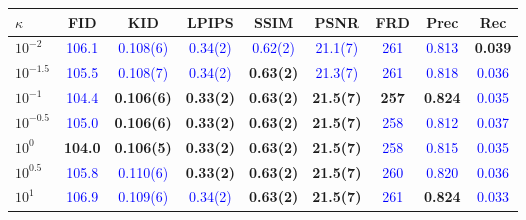 \documentclass[twoside,11pt]{article}
\begin{document}
\begin{table}[ht!]
\centering
\renewcommand{\arraystretch}{1.4}
\setlength{\tabcolsep}{6pt}
\small
\begin{tabular}{lcccccccc}
\toprule
\rowcolor{gray!20}
\textbf{$\kappa$} & \textbf{FID} & \textbf{KID} & \textbf{LPIPS} & \textbf{SSIM} & \textbf{PSNR} & \textbf{FRD} & \textbf{Prec} & \textbf{Rec} \\
\midrule
$10^{-2}$    & \textcolor{blue}{106.1} & \textcolor{blue}{0.108(6)} & \textcolor{blue}{0.34(2)} & \textcolor{blue}{0.62(2)} & \textcolor{blue}{21.1(7)} & \textcolor{blue}{261} & \textcolor{blue}{0.813} & \textbf{\textcolor{green!50!black}{0.039}} \\
$10^{-1.5}$  & \textcolor{blue}{105.5} & \textcolor{blue}{0.108(7)} & \textcolor{blue}{0.34(2)} & \textbf{\textcolor{green!50!black}{0.63(2)}} & \textcolor{blue}{21.3(7)} & \textcolor{blue}{261} & \textcolor{blue}{0.818} & \textcolor{blue}{0.036} \\
$10^{-1}$    & \textcolor{blue}{104.4} & \textbf{\textcolor{green!50!black}{0.106(6)}} & \textbf{\textcolor{green!50!black}{0.33(2)}} & \textbf{\textcolor{green!50!black}{0.63(2)}} & \textbf{\textcolor{green!50!black}{21.5(7)}} & \textbf{\textcolor{green!50!black}{257}} & \textbf{\textcolor{green!50!black}{0.824}} & \textcolor{blue}{0.035} \\
$10^{-0.5}$  & \textcolor{blue}{105.0} & \textbf{\textcolor{green!50!black}{0.106(6)}} & \textbf{\textcolor{green!50!black}{0.33(2)}} & \textbf{\textcolor{green!50!black}{0.63(2)}} & \textbf{\textcolor{green!50!black}{21.5(7)}} & \textcolor{blue}{258} & \textcolor{blue}{0.812} & \textcolor{blue}{0.037} \\
$10^{0}$     & \textbf{\textcolor{green!50!black}{104.0}} & \textbf{\textcolor{green!50!black}{0.106(5)}} & \textbf{\textcolor{green!50!black}{0.33(2)}} & \textbf{\textcolor{green!50!black}{0.63(2)}} & \textbf{\textcolor{green!50!black}{21.5(7)}} & \textcolor{blue}{258} & \textcolor{blue}{0.815} & \textcolor{blue}{0.035} \\
$10^{0.5}$   & \textcolor{blue}{105.8} & \textcolor{blue}{0.110(6)} & \textbf{\textcolor{green!50!black}{0.33(2)}} & \textbf{\textcolor{green!50!black}{0.63(2)}} & \textbf{\textcolor{green!50!black}{21.5(7)}} & \textcolor{blue}{260} & \textcolor{blue}{0.820} & \textcolor{blue}{0.036} \\
$10^{1}$     & \textcolor{blue}{106.9} & \textcolor{blue}{0.109(6)} & \textcolor{blue}{0.34(2)} & \textbf{\textcolor{green!50!black}{0.63(2)}} & \textbf{\textcolor{green!50!black}{21.5(7)}} & \textcolor{blue}{261} & \textbf{\textcolor{green!50!black}{0.824}} & \textcolor{blue}{0.033} \\

\end{tabular}
\end{table}
\end{document}
